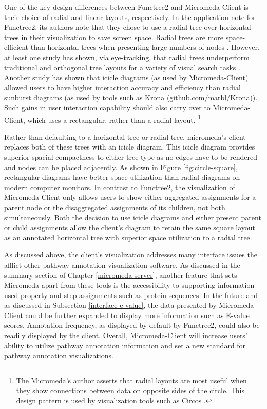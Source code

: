 One of the key design differences between Functree2 and Micromeda-Client is their choice of radial and linear layouts, respectively. In the application note for Functree2, its authors note that they chose to use a radial tree over horizontal trees in their visualization to save screen space. Radial trees are more space-efficient than horizontal trees when presenting large numbers of nodes \cite{burch2011evaluation}. However, at least one study has shown, via eye-tracking, that radial trees underperform traditional and orthogonal tree layouts for a variety of visual search tasks \cite{burch2011evaluation}. Another study has shown that icicle diagrams (as used by Micromeda-Client) allowed users to have higher interaction accuracy and efficiency \cite{muramalla2017radial} than radial sunburst diagrams (as used by tools such as Krona \cite{ondov2011interactive} (\href{github.com/marbl/Krona}{github.com/marbl/Krona})).
Such gains in user interaction capability should also carry over to Micromeda-Client, which uses a rectangular, rather than a radial layout. \footnote{The Micromeda's author asserts that radial layouts are most useful when they show connections between data on opposite sides of the circle. This design pattern is used by visualization tools such as Circos \cite{krzywinski2009circos}.} 

Rather than defaulting to a horizontal tree or radial tree, micromeda's client replaces both of these trees with an icicle diagram. This icicle diagram provides superior spacial compactness to either tree type as no edges have to be rendered and nodes can be placed adjacently. As shown in Figure \ref{fig:circle-square}, rectangular diagrams have better space utilization than radial diagrams on modern computer monitors. In contrast to Functree2, the visualization of Micromeda-Client only allows users to show either aggregated assignments for a parent node or the disaggregated assignments of its children, not both simultaneously. Both the decision to use icicle diagrams and either present parent or child assignments allow the client's diagram to retain the same square layout as an annotated horizontal tree with superior space utilization to a radial tree. 

As discussed above, the client's visualization addresses many interface issues the afflict other pathway annotation visualization software. As discussed in the summary section of Chapter \ref{micromeda-server}, another feature that sets Micromeda apart from these tools is the accessibility to supporting information used property and step assignments such as protein sequences. In the future and as discussed in Subsection \ref{interface-e-value}, the data presented by Micromeda-Client could be further expanded to display more information such as E-value scores. Annotation frequency, as displayed by default by Functree2, could also be readily displayed by the client. Overall, Micromeda-Client will increase users' ability to utilize pathway annotation information and set a new standard for pathway annotation visualizations.